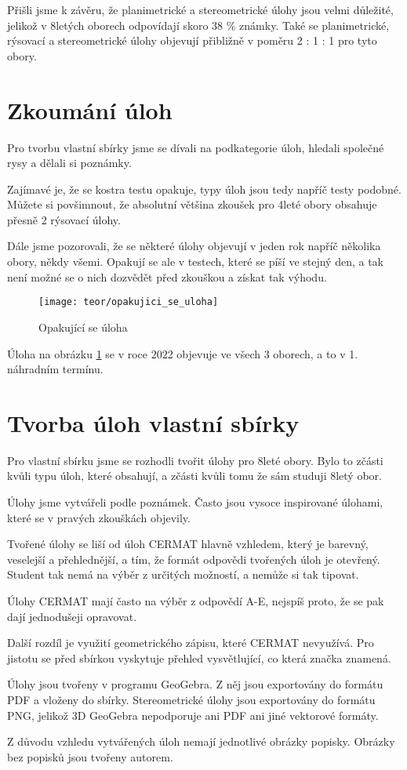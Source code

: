 Přišli jsme k závěru, že planimetrické a stereometrické úlohy jsou velmi důležité, jelikož v 8letých oborech odpovídají skoro 38 \% známky. Také se planimetrické, rýsovací a stereometrické úlohy objevují přibližně v poměru 2 : 1 : 1 pro tyto obory.




\section{Zkoumání úloh}

Pro tvorbu vlastní sbírky jsme se dívali na podkategorie úloh, hledali společné rysy a dělali si poznámky.

Zajímavé je, že se kostra testu opakuje, typy úloh jsou tedy napříč testy podobné. Můžete si povšimnout, že absolutní většina zkoušek pro 4leté obory obsahuje přesně 2 rýsovací úlohy.

Dále jsme pozorovali, že se některé úlohy objevují v jeden rok napříč několika obory, někdy všemi. Opakují se ale v testech, které se píší ve stejný den, a tak není možné se o nich dozvědět před zkouškou a získat tak výhodu.


\begin{figure}[h]
    \centering
    \texttt{[image: teor/opakujici\_se\_uloha]}
    \caption{Opakující se úloha ~\cite{CERMAT_pdfka}}
    \label{fig:opak_uloha}
\end{figure}

Úloha na obrázku \ref{fig:opak_uloha} se v roce 2022 objevuje ve všech 3 oborech, a to v 1. náhradním termínu.


\section{Tvorba úloh vlastní sbírky}

Pro vlastní sbírku jsme se rozhodli tvořit úlohy pro 8leté obory. Bylo to zčásti kvůli typu úloh, které obsahují, a zčásti kvůli tomu že sám studuji 8letý obor.

Úlohy jsme vytvářeli podle poznámek. Často jsou vysoce inspirované úlohami, které se v pravých zkouškách objevily.

Tvořené úlohy se liší od úloh CERMAT hlavně vzhledem, který je barevný, veselejší a přehlednější, a tím, že formát odpovědi tvořených úloh je otevřený. Student tak nemá na výběr z určitých možností, a nemůže si tak tipovat.

Úlohy CERMAT mají často na výběr z odpovědí A-E, nejspíš proto, že se pak dají jednodušeji opravovat.

Další rozdíl je využití geometrického zápisu, které CERMAT nevyužívá. Pro jistotu se před sbírkou vyskytuje přehled vysvětlující, co která značka znamená.

Úlohy jsou tvořeny v programu GeoGebra. Z něj jsou exportovány do formátu PDF a vloženy do sbírky. Stereometrické úlohy jsou exportovány do formátu PNG, jelikož 3D GeoGebra nepodporuje ani PDF ani jiné vektorové formáty.

Z důvodu vzhledu vytvářených úloh nemají jednotlivé obrázky popisky. Obrázky bez popisků jsou tvořeny autorem.

